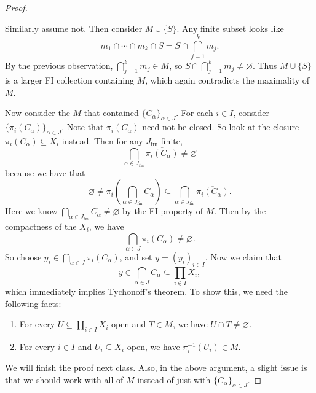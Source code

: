 \begin{proof}
\begin{enumerate}[(i)]
      Similarly assume not. Then consider
      $M \cup \{S\}$. Any finite subset looks like
      \[
        m_1 \cap \cdots \cap m_k \cap S = S \cap \bigcap_{j = 1}^k m_j.
      \]
      By the previous observation,
      $\bigcap_{j = 1}^k m_j \in M$, so
      $S \cap \bigcap_{j = 1}^k m_j \ne \varnothing$.
      Thus $M \cup \{S\}$ is a larger FI collection
      containing $M$, which again contradicts the
      maximality of $M$.
  \end{enumerate}
  Now consider the $M$ that contained
  $\{C_\alpha\}_{\alpha \in J}$. For each $i \in I$,
  consider $\{\pi_i(C_\alpha)\}_{\alpha \in J}$. Note
  that $\pi_i(C_\alpha)$ need not be closed.
  So look at the closure $\overline{\pi_i(C_\alpha)} \subseteq X_i$
  instead. Then for any $J_\text{fin}$ finite,
  \[
    \bigcap_{\alpha \in J_\text{fin}} \overline{\pi_i(C_\alpha)}
    \ne \varnothing
  \]
  because we have that
  \[
    \varnothing \ne \pi_i\left(\bigcap_{\alpha \in J_\text{fin}} C_\alpha\right)
    \subseteq \bigcap_{\alpha \in J_\text{fin}} \overline{\pi_i(C_\alpha)}.
  \]
  Here we know $\bigcap_{\alpha \in J_\text{fin}} C_\alpha \ne \varnothing$
  by the FI property of $M$. Then by the compactness
  of the $X_i$, we have
  \[
    \bigcap_{\alpha \in J} \overline{\pi_i(C_\alpha)}
    \ne \varnothing.
  \]
  So choose $y_i \in \bigcap_{\alpha \in J} \overline{\pi_i(C_\alpha)}$, and
  set $y = (y_i)_{i \in I}$. Now we claim that
  \[
    y \in \bigcap_{\alpha \in J} C_\alpha
    \subseteq \prod_{i \in I} X_i,
  \]
  which immediately implies Tychonoff's theorem.
  To show this, we need the following facts:
  \begin{enumerate}
    \item For every $U \subseteq \prod_{i \in I} X_i$ open and
      $T \in M$, we have $U \cap T \ne \varnothing$.
    \item For every $i \in I$ and
      $U_i \subseteq X_i$ open, we have
      $\pi_i^{-1}(U_i) \in M$.
  \end{enumerate}
  We will finish the proof next class. Also, in
  the above argument, a slight issue is that
  we should work with all of $M$ instead of
  just with $\{C_\alpha\}_{\alpha \in J}$.
\end{proof}
